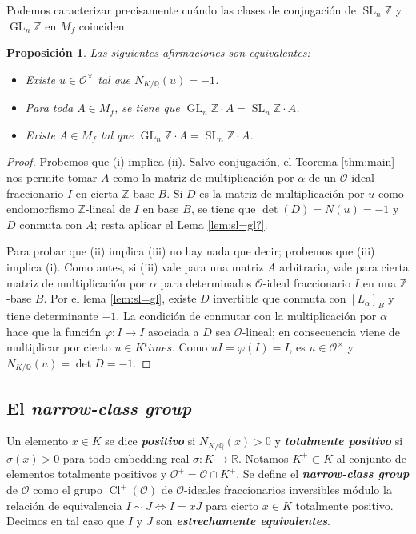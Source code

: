 \documentclass[11pt,a4paper]{amsart}
\newcommand{\R}{\mathbb{R}}
\newcommand{\Q}{\mathbb{Q}}
\newcommand{\Z}{\mathbb{Z}}
\renewcommand{\emph}[1]{\textbf{\textit{#1}}}
\DeclareMathOperator{\Cl}{Cl}
\DeclareMathOperator{\GL}{GL}
\DeclareMathOperator{\SL}{SL}
\numberwithin{equation}{section}
\theoremstyle{plain}
\newtheorem{prop}[equation]{Proposición}
\renewcommand{\O}{\mathcal{O}}
\begin{document}
Podemos caracterizar precisamente cuándo las clases de conjugación
de $\SL_n \Z$ y $\GL_n \Z$ en $M_f$ coinciden.

\begin{prop} \label{prop:uni-sl=gl} Las siguientes afirmaciones son equivalentes:
  \begin{itemize}
    \item[i)] Existe $u \in \O^\times$ tal que $N_{K/\Q}(u) = -1$.
    \item[ii)] Para toda $A \in M_f$, se tiene que $\GL_n \Z \cdot A =
    \SL_n \Z \cdot A$.
    \item[iii)] Existe $A \in M_f$ tal que $\GL_n \Z \cdot A =
    \SL_n \Z \cdot A$.
\end{itemize}
\end{prop}
\begin{proof} Probemos que (i) implica (ii). Salvo conjugación,
el Teorema \ref{thm:main} nos permite tomar $A$ como la matriz
de multiplicación por $\alpha$ de un $\O$-ideal fraccionario $I$
en cierta $\Z$-base $B$. Si $D$ es la matriz de multiplicación por
$u$ como endomorfismo $\Z$-lineal de $I$ en base $B$, se tiene
que $\det(D) = N(u) = -1$ y $D$ conmuta con $A$; resta
aplicar el Lema \ref{lem:sl=gl?}.

Para probar que (ii) implica (iii)
no hay nada que decir; probemos que (iii) implica (i).
Como antes, si (iii) vale para una matriz $A$ arbitraria,
vale para cierta matriz de multiplicación por $\alpha$ para determinados
$\O$-ideal fraccionario $I$ en una $\Z$-base $B$. Por el
lema \ref{lem:sl=gl}, existe $D$ invertible
que conmuta con $[L_\alpha]_B$ y tiene determinante $-1$. La condición
de conmutar con la multiplicación
por $\alpha$ hace que la función $\varphi \colon I \to I$ asociada a $D$
sea $\O$-lineal; en consecuencia viene de multiplicar por cierto
$u \in K^times$. Como $uI = \varphi(I) = I$, es $u \in \O^\times$
y $N_{K/\Q}(u) = \det D = -1$.
\end{proof}

\subsection{El \emph{narrow-class group}}

Un elemento $x \in K$ se dice \emph{positivo}
si $N_{K/\Q}(x) > 0$ y \emph{totalmente positivo}
si $\sigma(x) > 0$
para todo embedding real $\sigma \colon K \to \R$.
Notamos $K^+ \subset K$
al conjunto de elementos totalmente positivos y
$\O^+ = \O \cap K^+$.
Se define el \emph{narrow-class group} de $\O$ como
el grupo $\Cl^+(\O)$ de $\O$-ideales fraccionarios inversibles
módulo la relación de
equivalencia $I \sim J \iff I = xJ$ para cierto $x \in K$ totalmente
positivo. Decimos en tal caso que $I$ y $J$ son
\emph{estrechamente equivalentes}.
\end{document}
